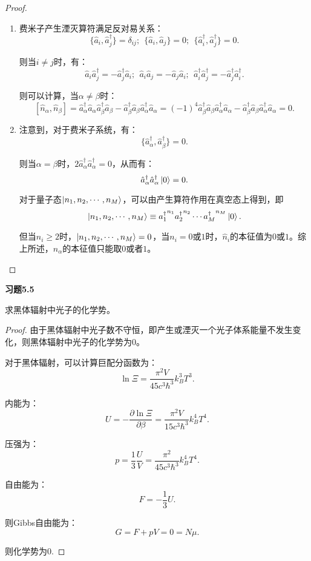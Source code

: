 \documentclass[reqno,a4paper,12pt]{amsart}
\begin{document}
\begin{proof}
\begin{enumerate}
\item 费米子产生湮灭算符满足反对易关系：
\[
	\{\hat{a}_i, \hat{a}^\dagger_j\} = \delta_{ij}; \ \ \{\hat{a}_i, \hat{a}_j\} = 0; \ \ \{\hat{a}^\dagger_i, \hat{a}^\dagger_j\} = 0.
\]

则当$i\neq j$时，有：
\[
	\hat{a}_i\hat{a}_j^\dagger = -\hat{a}_j^\dagger\hat{a}_i; \ \ \hat{a}_i \hat{a}_j = -\hat{a}_j\hat{a}_i; \ \ \hat{a}_i^\dagger\hat{a}_j^\dagger = - \hat{a}_j^\dagger \hat{a}_i^\dagger.
\]

则可以计算，当$\alpha\neq \beta$时：
\[
	[\hat{n}_\alpha, \hat{n}_\beta] = \hat{a}^\dagger_\alpha\hat{a}_\alpha \hat{a}_\beta^\dagger\hat{a}_\beta - \hat{a}_\beta^\dagger\hat{a}_\beta \hat{a}^\dagger_\alpha\hat{a}_\alpha = (-1)^4 \hat{a}_\beta^\dagger\hat{a}_\beta \hat{a}^\dagger_\alpha\hat{a}_\alpha - \hat{a}_\beta^\dagger\hat{a}_\beta \hat{a}^\dagger_\alpha\hat{a}_\alpha = 0.
\]

\item 注意到，对于费米子系统，有：
\[
	\{ \hat{a}_\alpha^\dagger, \hat{a}_\beta^\dagger\} = 0.
\]

则当$\alpha=\beta$时，$2\hat{a}_\alpha^\dagger\hat{a}_\alpha^\dagger = 0$，从而有：
\[
	\hat{a}_\alpha^\dagger \hat{a}_\alpha^\dagger \ket{0} = 0.
\]

对于量子态$\ket{n_1, n_2, \cdots, n_M}$，可以由产生算符作用在真空态上得到，即
\[
	\ket{n_1, n_2, \cdots, n_M} \equiv {a_1^\dagger}^{n_1}{a_2^\dagger}^{n_2}\cdots{a_M^\dagger}^{n_M} \ket{0}.
\]

但当$n_i\geq2$时，$\ket{n_1, n_2, \cdots, n_M} = 0$，当$n_i=0$或$1$时，$\hat{n}_i$的本征值为$0$或$1$。综上所述，$\hat{n}_\alpha$的本征值只能取$0$或者$1$。
\end{enumerate}
\end{proof}

\medskip

\textbf{习题5.5}

求黑体辐射中光子的化学势。

\begin{proof}
由于黑体辐射中光子数不守恒，即产生或湮灭一个光子体系能量不发生变化，则黑体辐射中光子的化学势为$0$。

对于黑体辐射，可以计算巨配分函数为：
\[
	\ln \varXi = \frac{\pi^2V}{45c^3\hbar^3} k_B^3 T^3.
\]

内能为：
\[
	U = -\frac{\partial \ln \varXi}{\partial \beta} = \frac{\pi^2V}{15c^3\hbar^3} k_B^4T^4.
\]

压强为：
\[
	p = \frac{1}{3}\frac{U}{V} = \frac{\pi^2}{45c^3\hbar^3} k_B^4T^4.
\]

自由能为：
\[
	F = -\frac{1}{3}U.
\]

则Gibbs自由能为：
\[
	G = F+pV = 0 = N\mu.
\]

则化学势为0.
\end{proof}
\end{document}
